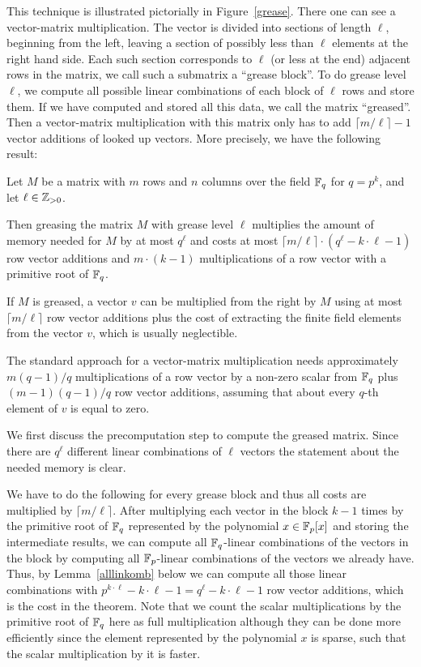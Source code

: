This technique is illustrated pictorially in Figure~\ref{grease}. There
one can see a vector-matrix multiplication. The vector is divided into
sections of length $\ell$, beginning from the left, leaving a section of
possibly less than $\ell$ elements at the right hand side. Each such section
corresponds to $\ell$ (or less at the end) adjacent rows in the matrix, we 
call such a submatrix a ``grease block''.
To do grease level $\ell$, we compute all possible linear combinations of
each block of $\ell$ rows and store them. If we have computed and stored
all this data, we call the matrix ``greased''.
Then a vector-matrix multiplication
with this matrix only has to add $\lceil m/\ell \rceil -1$ vector additions
of looked up vectors. More precisely, we have the following result:

\begin{Theo}
\label{theogrease}
Let $M$ be a matrix with $m$ rows and $n$ columns over the field\/ $\mathbb{F}_q$
for $q = p^k$, and let $\ell \in \mathbb{Z}_{> 0}$.

Then greasing the matrix $M$ with grease level $\ell$ multiplies the amount
of memory needed for $M$ by at most $q^\ell$ and costs at most 
$\lceil m/\ell \rceil \cdot (q^\ell-k\cdot \ell -1)$ row vector additions 
and $m \cdot (k-1)$ multiplications of a row vector with a primitive
root of $\mathbb{F}_q$.

If $M$ is greased, a vector $v$ can be multiplied from the right by $M$
using at most $\lceil m/\ell \rceil$ row vector additions plus the 
cost of extracting the finite field elements from the vector $v$, which
is usually neglectible.

The standard approach for a vector-matrix multiplication needs 
approximately $m(q-1)/q$ multiplications of a row vector by a non-zero
scalar from $\mathbb{F}_q$ plus $(m-1)(q-1)/q$ row vector additions, assuming that 
about every $q$-th element of $v$ is equal to zero.
\end{Theo}
\Proof We first discuss the precomputation step to compute the greased
matrix. Since there are $q^\ell$ different linear combinations of $\ell$ 
vectors the statement about the needed memory is clear.

We have to do the following for every grease block and thus 
all costs are multiplied by $\lceil m/\ell \rceil$. 
After multiplying each vector in the
block $k-1$ times by the primitive root of $\mathbb{F}_q$ represented by the
polynomial $x \in \mathbb{F}_p[x]$ and storing the intermediate results, 
we can compute all $\mathbb{F}_q$-linear combinations
of the vectors in the block by computing all $\mathbb{F}_p$-linear combinations
of the vectors we already have. Thus, by Lemma~\ref{alllinkomb} below we can
compute all those linear combinations with 
$p^{k\cdot \ell} - k\cdot \ell - 1 = 
q^\ell - k \cdot \ell - 1$ row vector additions, which is the cost in the
theorem. Note that we count the scalar multiplications by the
primitive root of\/ $\mathbb{F}_q$ here as full multiplication although they can be done
more efficiently since the element represented by the polynomial $x$
is sparse, such that the scalar multiplication by it is faster.

